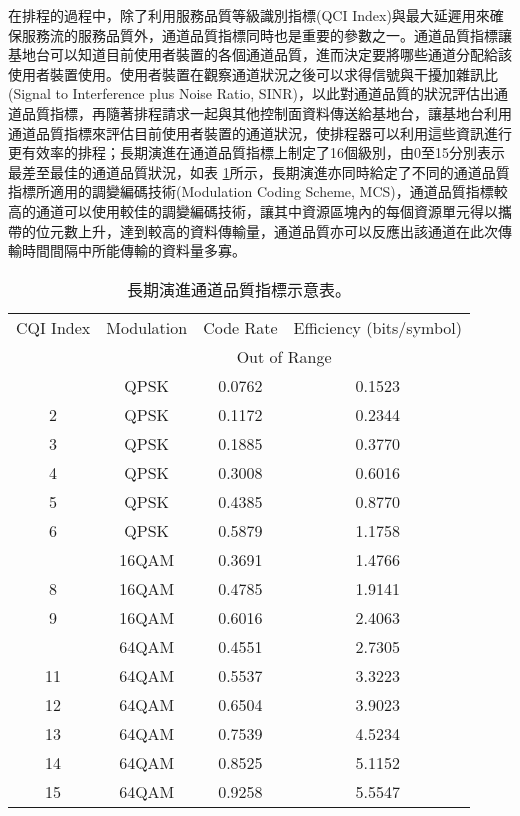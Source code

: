 在排程的過程中，除了利用服務品質等級識別指標(QCI Index)與最大延遲用來確保服務流的服務品質外，通道品質指標同時也是重要的參數之一。通道品質指標讓基地台可以知道目前使用者裝置的各個通道品質，進而決定要將哪些通道分配給該使用者裝置使用。使用者裝置在觀察通道狀況之後可以求得信號與干擾加雜訊比(Signal to Interference plus Noise Ratio, SINR)，以此對通道品質的狀況評估出通道品質指標，再隨著排程請求一起與其他控制面資料傳送給基地台，讓基地台利用通道品質指標來評估目前使用者裝置的通道狀況，使排程器可以利用這些資訊進行更有效率的排程；長期演進在通道品質指標上制定了16個級別，由0至15分別表示最差至最佳的通道品質狀況，如表 \ref{tab:CQI}\cite{PHY_spec}所示，長期演進亦同時給定了不同的通道品質指標所適用的調變編碼技術(Modulation Coding Scheme, MCS)，通道品質指標較高的通道可以使用較佳的調變編碼技術，讓其中資源區塊內的每個資源單元得以攜帶的位元數上升，達到較高的資料傳輸量\cite{mukh2015}，通道品質亦可以反應出該通道在此次傳輸時間間隔中所能傳輸的資料量多寡。
\vskip 10pt
\begin{table}[H]
\centering
\caption{長期演進通道品質指標示意表。}
\vskip 5pt
\label{tab:CQI}
\begin{tabular}{|c|c|c|c|}
\hline
CQI Index & Modulation & Code Rate & Efficiency (bits/symbol)\\ \thickhline
0         & \multicolumn{3}{c|}{Out of Range}                \\ \thickhline
1         & QPSK       & 0.0762    & 0.1523                  \\ \hline
2         & QPSK       & 0.1172    & 0.2344                  \\ \hline
3         & QPSK       & 0.1885    & 0.3770                  \\ \hline
4         & QPSK       & 0.3008    & 0.6016                  \\ \hline
5         & QPSK       & 0.4385    & 0.8770                  \\ \hline
6         & QPSK       & 0.5879    & 1.1758                  \\ \thickhline
7         & 16QAM      & 0.3691    & 1.4766                  \\ \hline
8         & 16QAM      & 0.4785    & 1.9141                  \\ \hline
9         & 16QAM      & 0.6016    & 2.4063                  \\ \thickhline
10        & 64QAM      & 0.4551    & 2.7305                  \\ \hline
11        & 64QAM      & 0.5537    & 3.3223                  \\ \hline
12        & 64QAM      & 0.6504    & 3.9023                  \\ \hline
13        & 64QAM      & 0.7539    & 4.5234                  \\ \hline
14        & 64QAM      & 0.8525    & 5.1152                  \\ \hline
15        & 64QAM      & 0.9258    & 5.5547                  \\ \hline
\end{tabular}
\end{table}

